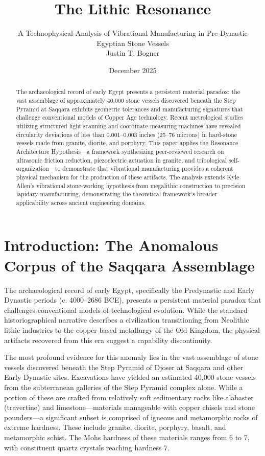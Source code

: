 \documentclass[11pt]{article}
\title{The Lithic Resonance}
\author{A Technophysical Analysis of Vibrational Manufacturing in Pre-Dynastic Egyptian Stone Vessels\\[0.5em]\small Justin T. Bogner}
\date{December 2025}
\begin{document}
\maketitle
\thispagestyle{empty}

\begin{abstract}
The archaeological record of early Egypt presents a persistent material paradox: the vast assemblage of approximately 40,000 stone vessels discovered beneath the Step Pyramid at Saqqara exhibits geometric tolerances and manufacturing signatures that challenge conventional models of Copper Age technology. Recent metrological studies utilizing structured light scanning and coordinate measuring machines have revealed circularity deviations of less than 0.001--0.003 inches (25--76 microns) in hard-stone vessels made from granite, diorite, and porphyry. This paper applies the Resonance Architecture Hypothesis---a framework synthesizing peer-reviewed research on ultrasonic friction reduction, piezoelectric actuation in granite, and tribological self-organization---to demonstrate that vibrational manufacturing provides a coherent physical mechanism for the production of these artifacts. The analysis extends Kyle Allen's vibrational stone-working hypothesis from megalithic construction to precision lapidary manufacturing, demonstrating the theoretical framework's broader applicability across ancient engineering domains.
\end{abstract}

\tableofcontents
\newpage

\section{Introduction: The Anomalous Corpus of the Saqqara Assemblage}

The archaeological record of early Egypt, specifically the Predynastic and Early Dynastic periods (c. 4000--2686 BCE), presents a persistent material paradox that challenges conventional models of technological evolution. While the standard historiographical narrative describes a civilization transitioning from Neolithic lithic industries to the copper-based metallurgy of the Old Kingdom, the physical artifacts recovered from this era suggest a capability discontinuity.

The most profound evidence for this anomaly lies in the vast assemblage of stone vessels discovered beneath the Step Pyramid of Djoser at Saqqara and other Early Dynastic sites. Excavations have yielded an estimated 40,000 stone vessels from the subterranean galleries of the Step Pyramid complex alone. While a portion of these are crafted from relatively soft sedimentary rocks like alabaster (travertine) and limestone---materials manageable with copper chisels and stone pounders---a significant subset is comprised of igneous and metamorphic rocks of extreme hardness. These include granite, diorite, porphyry, basalt, and metamorphic schist. The Mohs hardness of these materials ranges from 6 to 7, with constituent quartz crystals reaching hardness 7.
\end{document}
